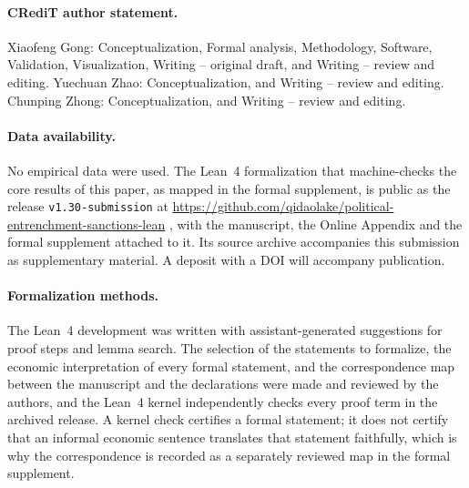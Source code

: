 \paragraph{CRediT author statement.} Xiaofeng Gong:
Conceptualization, Formal analysis, Methodology, Software, Validation,
Visualization, Writing -- original draft, and Writing -- review and
editing. Yuechuan Zhao: Conceptualization, and Writing -- review and
editing. Chunping Zhong: Conceptualization, and Writing -- review and
editing.

\paragraph{Data availability.} No empirical data were used. The Lean~4 formalization
that machine-checks the core results of this paper, as mapped in the formal supplement, is
public as the release \texttt{v1.30-submission} at
\url{https://github.com/qidaolake/political-entrenchment-sanctions-lean}
\citep{GongLean2026}, with the manuscript, the Online Appendix and the formal supplement
attached to it. Its source archive accompanies this submission as supplementary material.
A deposit with a DOI will accompany publication.

\paragraph{Formalization methods.} The Lean~4 development was written with
assistant-generated suggestions for proof steps and lemma search. The
selection of the statements to formalize, the economic interpretation of
every formal statement, and the correspondence map between the manuscript
and the declarations were made and reviewed by the authors, and the Lean~4
kernel independently checks every proof term in the archived release. A
kernel check certifies a formal statement; it does not certify that an
informal economic sentence translates that statement faithfully, which is
why the correspondence is recorded as a separately reviewed map in the
formal supplement.



